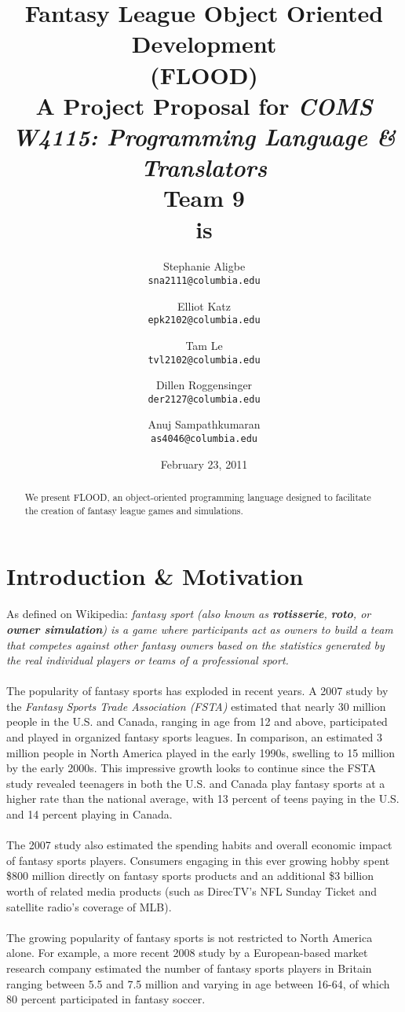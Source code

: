 \documentclass[12pt]{article}
\title{
\textbf{Fantasy League Object Oriented Development}\\
\textbf{(FLOOD)}\\
{\small A Project Proposal for {\it COMS W4115: Programming Language \& Translators}}\\
{\large \textbf{Team 9}}\\
\large{\textbf{is}}
}
\author{
  Stephanie Aligbe\\
  \texttt{\small{sna2111@columbia.edu}}
  \and
  Elliot Katz\\
  \texttt{\small{epk2102@columbia.edu}}
  \and
  Tam Le\\
  \texttt{\small{tvl2102@columbia.edu}}
  \and
  Dillen Roggensinger\\
  \texttt{\small{der2127@columbia.edu}}
  \and
  Anuj Sampathkumaran\\
  \texttt{\small{as4046@columbia.edu}}
}
\date{February 23, 2011}
\begin{document}
\maketitle

\begin{abstract}
We present FLOOD, an object-oriented programming language designed to facilitate the creation of fantasy league games and simulations. 
\begin{center}

\end{center}
\end{abstract}

\section{Introduction \& Motivation}
As defined on Wikipedia: \textit{fantasy sport (also known as \textbf{rotisserie}, \textbf{roto}, or \textbf{owner simulation}) is a game where participants act as owners to build a team that competes against other fantasy owners based on the statistics generated by the real individual players or teams of a professional sport.}
\\\\
The popularity of fantasy sports has exploded in recent years. A 2007 study by the {\it Fantasy Sports Trade Association (FSTA)} estimated that nearly 30 million people in the U.S. and Canada, ranging in age from 12 and above, participated and played in organized fantasy sports leagues. In comparison, an estimated 3 million people in North America played in the early 1990s, swelling to 15 million by the early 2000s. This impressive growth looks to continue since the FSTA study revealed teenagers in both the U.S. and Canada play fantasy sports at a higher rate than the national average, with 13 percent of teens paying in the U.S. and 14 percent playing in Canada.
\\\\
The 2007 study also estimated the spending habits and overall economic impact of fantasy sports players. Consumers engaging in this ever growing hobby spent \$800 million directly on fantasy sports products and an additional \$3 billion worth of related media products (such as DirecTV's NFL Sunday Ticket and satellite radio's coverage of MLB).
\\\\
The growing popularity of fantasy sports is not restricted to North America alone. For example, a more recent 2008 study by a European-based market research company estimated the number of fantasy sports players in Britain ranging between 5.5 and 7.5 million and varying in age between 16-64, of which 80 percent participated in fantasy soccer.
\end{document}
